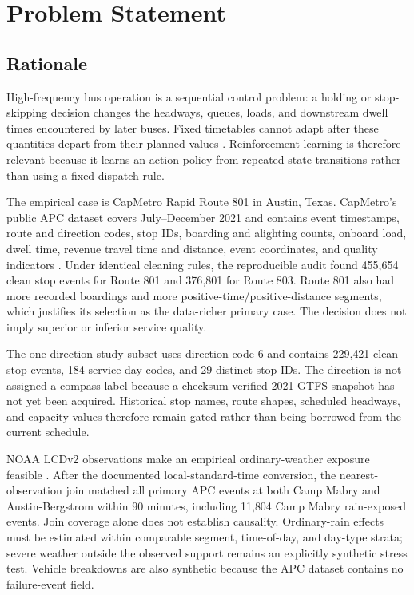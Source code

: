 \chapter{Problem Statement}

\section{Rationale}\label{sec:rationale}

High-frequency bus operation is a sequential control problem: a holding or stop-skipping decision changes the headways, queues, loads, and downstream dwell times encountered by later buses. Fixed timetables cannot adapt after these quantities depart from their planned values \cite{Ceder2007,Daganzo2009}. Reinforcement learning is therefore relevant because it learns an action policy from repeated state transitions rather than using a fixed dispatch rule.

The empirical case is CapMetro Rapid Route 801 in Austin, Texas. CapMetro's public APC dataset covers July--December 2021 and contains event timestamps, route and direction codes, stop IDs, boarding and alighting counts, onboard load, dwell time, revenue travel time and distance, event coordinates, and quality indicators \cite{TexasCapMetroAPC2021}. Under identical cleaning rules, the reproducible audit found 455{,}654 clean stop events for Route 801 and 376{,}801 for Route 803. Route 801 also had more recorded boardings and more positive-time/positive-distance segments, which justifies its selection as the data-richer primary case. The decision does not imply superior or inferior service quality.

The one-direction study subset uses direction code 6 and contains 229{,}421 clean stop events, 184 service-day codes, and 29 distinct stop IDs. The direction is not assigned a compass label because a checksum-verified 2021 GTFS snapshot has not yet been acquired. Historical stop names, route shapes, scheduled headways, and capacity values therefore remain gated rather than being borrowed from the current schedule.

NOAA LCDv2 observations make an empirical ordinary-weather exposure feasible \cite{NOAALCDv2}. After the documented local-standard-time conversion, the nearest-observation join matched all primary APC events at both Camp Mabry and Austin-Bergstrom within 90 minutes, including 11{,}804 Camp Mabry rain-exposed events. Join coverage alone does not establish causality. Ordinary-rain effects must be estimated within comparable segment, time-of-day, and day-type strata; severe weather outside the observed support remains an explicitly synthetic stress test. Vehicle breakdowns are also synthetic because the APC dataset contains no failure-event field.

